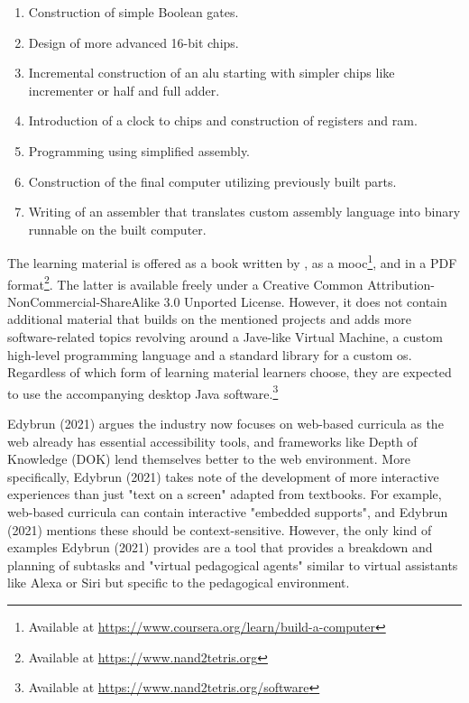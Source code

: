 \begin{enumerate}
    \item Construction of simple Boolean gates.
    \item Design of more advanced 16-bit chips.
    \item Incremental construction of an \gls{alu} starting with simpler chips like incrementer or half and full adder.
    \item Introduction of a clock to chips and construction of registers and \gls{ram}.
    \item Programming using simplified assembly.
    \item Construction of the final computer utilizing previously built parts.
    \item Writing of an assembler that translates custom assembly language into binary runnable on the built computer.
\end{enumerate}

The learning material is offered as a book written by \textcite{nand2tetris}, as a \gls{mooc}\footnote{Available at \url{https://www.coursera.org/learn/build-a-computer}}, and in a PDF format\footnote{Available at \url{https://www.nand2tetris.org}}.
The latter is available freely under a Creative Common Attribution-NonCommercial-ShareAlike 3.0 Unported License.
However, it does not contain additional material that builds on the mentioned projects and adds more software-related topics revolving around a Jave-like Virtual Machine, a custom high-level programming language and a standard library for a custom \gls{os}.
Regardless of which form of learning material learners choose, they are expected to use the accompanying desktop Java software.\footnote{Available at \url{https://www.nand2tetris.org/software}}

Edybrun (2021) argues the industry now focuses on web-based curricula as the web already has essential accessibility tools, and frameworks like Depth of Knowledge (DOK) lend themselves better to the web environment.
More specifically, Edybrun (2021) takes note of the development of more interactive experiences than just "text on a screen" adapted from textbooks.
For example, web-based curricula can contain interactive "embedded supports", and Edybrun (2021) mentions these should be context-sensitive.
However, the only kind of examples Edybrun (2021) provides are a tool that provides a breakdown and planning of subtasks and "virtual pedagogical agents" similar to virtual assistants like Alexa or Siri but specific to the pedagogical environment.

